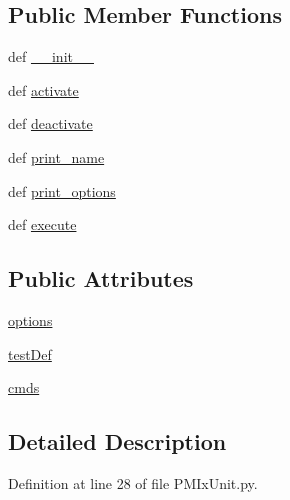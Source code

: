 \subsection*{Public Member Functions}
\begin{DoxyCompactItemize}
\item 
def \hyperlink{class_p_m_ix_unit_1_1_p_m_ix_unit_a01b0f667b854dc0d7051c071d01f2cdb}{\-\_\-\-\_\-init\-\_\-\-\_\-}
\item 
def \hyperlink{class_p_m_ix_unit_1_1_p_m_ix_unit_af9eb3845f804e5cff57f0b96a5c1d912}{activate}
\item 
def \hyperlink{class_p_m_ix_unit_1_1_p_m_ix_unit_a77590898cef9e5d560857e25a00ee287}{deactivate}
\item 
def \hyperlink{class_p_m_ix_unit_1_1_p_m_ix_unit_a64943a4530694aa835f021d0442fc8dd}{print\-\_\-name}
\item 
def \hyperlink{class_p_m_ix_unit_1_1_p_m_ix_unit_a716d70327c8f43718a74e99e87eb05e1}{print\-\_\-options}
\item 
def \hyperlink{class_p_m_ix_unit_1_1_p_m_ix_unit_a692047ba1b5639b1c02f25922cd014bb}{execute}
\end{DoxyCompactItemize}
\subsection*{Public Attributes}
\begin{DoxyCompactItemize}
\item 
\hyperlink{class_p_m_ix_unit_1_1_p_m_ix_unit_a6c56979e7226a414874653b3e7a17dd8}{options}
\item 
\hyperlink{class_p_m_ix_unit_1_1_p_m_ix_unit_a08b01eaf2867a0a02f8598018739e843}{test\-Def}
\item 
\hyperlink{class_p_m_ix_unit_1_1_p_m_ix_unit_a1130f07074aeff223235a147440868c4}{cmds}
\end{DoxyCompactItemize}


\subsection{Detailed Description}


Definition at line 28 of file P\-M\-Ix\-Unit.\-py.



